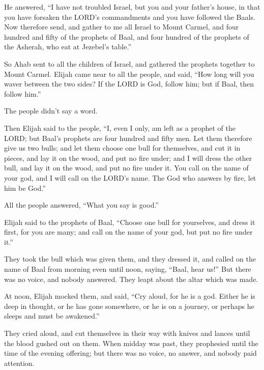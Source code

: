  He answered, ``I have not troubled Israel, but you and
your father's house, in that you have forsaken the LORD's commandments
and you have followed the Baals.  Now therefore send, and
gather to me all Israel to Mount Carmel, and four hundred and fifty of
the prophets of Baal, and four hundred of the prophets of the Asherah,
who eat at Jezebel's table.''

 So Ahab sent to all the children of Israel, and gathered
the prophets together to Mount Carmel.  Elijah came near to
all the people, and said, ``How long will you waver between the two
sides? If the LORD is God, follow him; but if Baal, then follow him.''

The people didn't say a word.

 Then Elijah said to the people, ``I, even I only, am left
as a prophet of the LORD; but Baal's prophets are four hundred and fifty
men.  Let them therefore give us two bulls; and let them
choose one bull for themselves, and cut it in pieces, and lay it on the
wood, and put no fire under; and I will dress the other bull, and lay it
on the wood, and put no fire under it.  You call on the
name of your god, and I will call on the LORD's name. The God who
answers by fire, let him be God.''

All the people answered, ``What you say is good.''

 Elijah said to the prophets of Baal, ``Choose one bull for
yourselves, and dress it first, for you are many; and call on the name
of your god, but put no fire under it.''

 They took the bull which was given them, and they dressed
it, and called on the name of Baal from morning even until noon, saying,
``Baal, hear us!'' But there was no voice, and nobody answered. They
leapt about the altar which was made.

 At noon, Elijah mocked them, and said, ``Cry aloud, for he
is a god. Either he is deep in thought, or he has gone somewhere, or he
is on a journey, or perhaps he sleeps and must be awakened.''

 They cried aloud, and cut themselves in their way with
knives and lances until the blood gushed out on them.  When
midday was past, they prophesied until the time of the evening offering;
but there was no voice, no answer, and nobody paid attention.

